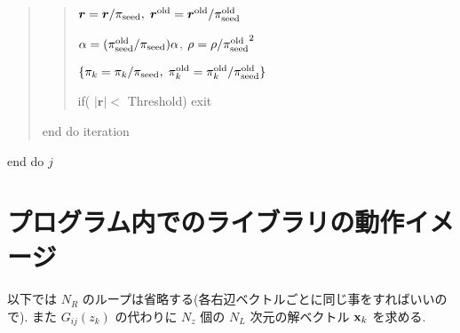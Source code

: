 \documentclass[letterpaper,10pt,dvipdfmx,openany]{sphinxmanual}
\begin{document}
\begin{quote}
\begin{quote}
\({\boldsymbol r} = {\boldsymbol r} / \pi_{\rm seed},\; {\boldsymbol r}^{\rm old} = {\boldsymbol r}^{\rm old} / \pi_{\rm seed}^{\rm old}\)

\(\alpha = (\pi_{\rm seed}^{\rm old} / \pi_{\rm seed}) \alpha\), \(\rho = \rho / {\pi_{\rm seed}^{\rm old}}^2\)

\(\{\pi_k = \pi_k/\pi_{\rm seed},\; \pi_k^{\rm old} = \pi_k^{\rm old}/\pi_{\rm seed}^{\rm old}\}\)

if( \(|{\boldsymbol r}| <\) Threshold) exit
\end{quote}

end do iteration
\end{quote}

end do \(j\)


\chapter{プログラム内でのライブラリの動作イメージ}
\label{komega_workflow_ja::doc}\label{komega_workflow_ja:id1}
以下では \(N_R\) のループは省略する(各右辺ベクトルごとに同じ事をすればいいので).
また \(G_{i j}(z_k)\) の代わりに \(N_z\) 個の \(N_L\) 次元の解ベクトル \({\bf x}_{k}\) を求める.
\end{document}
